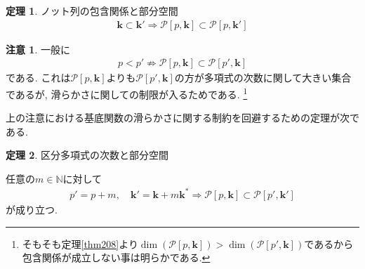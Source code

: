 \documentclass{jsarticle}
\newcommand\subknot[1]{{#1}^*}
\theoremstyle{definition}%
\newtheorem{thm}{定理}
\newtheorem*{rem}{注意}
\newcommand\UC{\textcolor{red}{(執筆中です)}}
\begin{document}
\begin{screen}
	\begin{thm}
        \label{Thm310}
		ノット列の包含関係と部分空間
		\begin{align}
			\bm{k}\subset\bm{k}'
			\Rightarrow
			\mathcal{P}[p, \bm{k}]\subset \mathcal{P}[p, \bm{k}']
		\end{align}
	\end{thm}
\end{screen}


\begin{rem}
	一般に
	\begin{align}
		p<p'
		\not\Rightarrow
		\mathcal{P}[p, \bm{k}]\subset \mathcal{P}[p', \bm{k}]
	\end{align}
	である.
	これは$\mathcal{P}[p, \bm{k}]$よりも$\mathcal{P}[p', \bm{k}]$の方が多項式の次数に関して大きい集合であるが, 滑らかさに関しての制限が入るためである.%
	\footnote{そもそも定理\ref{thm208}より$\dim(\mathcal{P}[p, \bm{k}])>\dim(\mathcal{P}[p', \bm{k}])$であるから包含関係が成立しない事は明らかである.}
\end{rem}

上の注意における基底関数の滑らかさに関する制約を回避するための定理が次である.
\begin{screen}
	\begin{thm}
        \label{Thm311}
		区分多項式の次数と部分空間

		任意の$m\in\mathbb{N}$に対して
		\begin{align}
			p'=p+m, \quad
			\bm{k}'=\bm{k}+m\subknot{\bm{k}}
			\Rightarrow
			\mathcal{P}[p, \bm{k}]\subset \mathcal{P}[p', \bm{k}']
		\end{align}
		が成り立つ.
	\end{thm}
\end{screen}



\newpage
\end{document}
